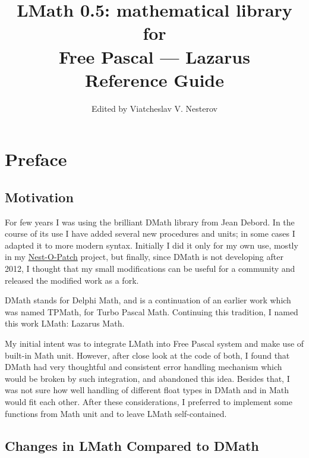 \documentclass[12pt,a4paper,oneside]{report}
\begin{document}
\title{LMath 0.5: mathematical library for\\ Free Pascal --- Lazarus\\
{\Large Reference Guide}}

\author{Edited by Viatcheslav V. Nesterov}
\maketitle
\newpage
\label{toc}\tableofcontents
\newpage
\newlength{\tmplength}


\chapter*{Preface}
\section*{Motivation}
For few years I was using the brilliant DMath library from Jean Debord. In the course of its use I have added several new procedures and units; in some cases I adapted it to more modern syntax. Initially I did it only for my own use, mostly in my \href{https://sourceforge.net/projects/nestopatch/}{Nest-O-Patch} project, but finally, since DMath is not developing after 2012, I thought that my small modifications can be useful for a community and released the modified work as a fork. 

DMath stands for Delphi Math, and is a continuation of an earlier work which was named TPMath, for Turbo Pascal Math. Continuing this tradition, I named this work LMath: Lazarus Math.

My initial intent was to integrate LMath into Free Pascal system and make use of built-in Math unit. However, after close look at the code of both, I found that DMath had very thoughtful and consistent error handling mechanism which would be broken by such integration, and abandoned this idea. Besides that, I was not sure how well handling of different float types in DMath and in Math would fit each other. After these considerations, I preferred to implement some functions from Math unit and to leave LMath self-contained.
\section*{Changes in LMath Compared to DMath}
\end{document}
